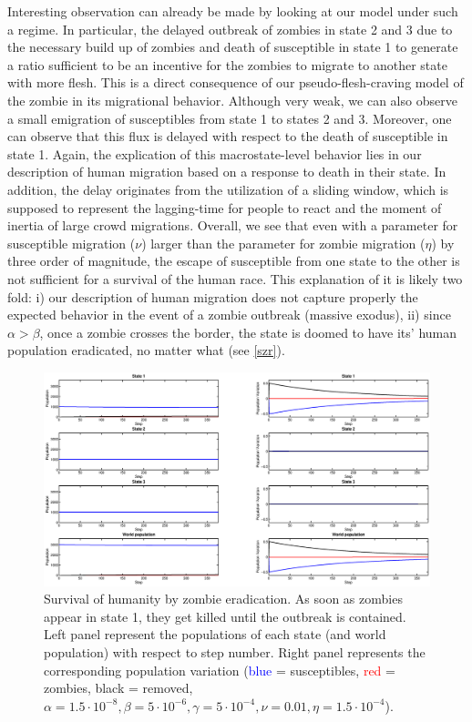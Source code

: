 \documentclass[11pt]{article} %
\begin{document}
Interesting observation can already be made by looking at our model under such a regime. In particular, the delayed outbreak of zombies in state 2 and 3 due to the necessary build up of zombies and death of susceptible in state 1 to generate a ratio sufficient to be an incentive for the zombies to migrate to another state with more flesh. This is a direct consequence of our pseudo-flesh-craving model of the zombie in its migrational behavior. Although very weak, we can also observe a small emigration of susceptibles from state 1 to states 2 and 3. Moreover, one can observe that this flux is delayed with respect to the death of susceptible in state 1. Again, the explication of this macrostate-level behavior lies in our description of human migration based on a response to death in their state. In addition, the delay originates from the utilization of a sliding window, which is supposed to represent the lagging-time for people to react and the moment of inertia of large crowd migrations. Overall, we see that even with a parameter for susceptible migration ($\nu$) larger than the parameter for zombie migration ($\eta$) by three order of magnitude, the escape of susceptible from one state to the other is not sufficient for a survival of the human race. This explanation of it is likely two fold: i) our description of human migration does not capture properly the expected behavior in the event of a zombie outbreak (massive exodus), ii) since $\alpha>\beta$, once a zombie crosses the border, the state is doomed to have its' human population eradicated, no matter what (see \ref{szr}). 
\begin{figure}[h!]
\centerline{
\includegraphics[scale=0.35]{../images/Matlab_figures/example_zkill.eps}}
\caption{Survival of humanity by zombie eradication. As soon as zombies appear in state 1, they get killed until the outbreak is contained. Left panel represent the populations of each state (and world population) with respect to step number. Right panel represents the corresponding population variation (\textcolor{blue}{blue} = susceptibles, \textcolor{red}{red} = zombies, black = removed, $\alpha=1.5\cdot10^{-8}, \beta=5\cdot10^{-6}, \gamma=5\cdot10^{-4}, \nu=0.01, \eta=1.5\cdot10^{-4}$).
\label{skill} }
\end{figure}
\end{document}
